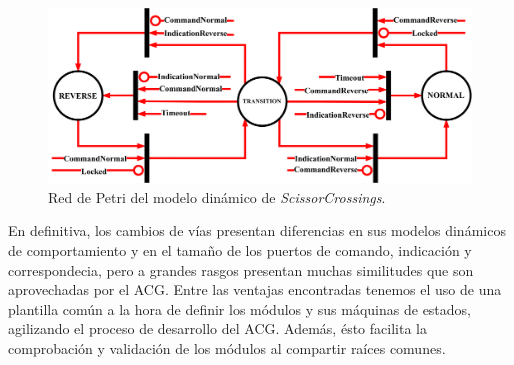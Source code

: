 \begin{figure}[H]
	\centering
	\includegraphics[width=1\textwidth]{Figuras/SSW_Petri}
	\centering\caption{Red de Petri del modelo dinámico de \textit{ScissorCrossings}.}
	\label{fig:SCR_Petri}
\end{figure}

En definitiva, los cambios de vías presentan diferencias en sus modelos dinámicos de comportamiento y en el tamaño de los puertos de comando, indicación y correspondecia, pero a grandes rasgos presentan muchas similitudes que son aprovechadas por el ACG. Entre las ventajas encontradas tenemos el uso de una plantilla común a la hora de definir los módulos y sus máquinas de estados, agilizando el proceso de desarrollo del ACG. Además, ésto facilita la comprobación y validación de los módulos al compartir raíces comunes.
